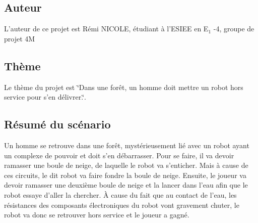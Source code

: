 \subsection*{Auteur }

L'auteur de ce projet est Rémi N\-I\-C\-O\-L\-E, étudiant à l'E\-S\-I\-E\-E en E$_{\mbox{1}}$ -\/4, groupe de projet 4\-M

\subsection*{Thème }

Le thème du projet est \char`\"{}\-Dans une forêt, un homme doit mettre un robot hors
service pour s'en délivrer.\char`\"{}.

\subsection*{Résumé du scénario }

Un homme se retrouve dans une forêt, mystérieusement lié avec un robot ayant un complexe de pouvoir et doit s'en débarrasser. Pour se faire, il va devoir ramasser une boule de neige, de laquelle le robot va s'enticher. Mais à cause de ces circuits, le dit robot va faire fondre la boule de neige. Ensuite, le joueur va devoir ramasser une deuxième boule de neige et la lancer dans l'eau afin que le robot essaye d'aller la chercher. À cause du fait que au contact de l'eau, les résistances des composants électroniques du robot vont gravement chuter, le robot va donc se retrouver hors service et le joueur a gagné. 